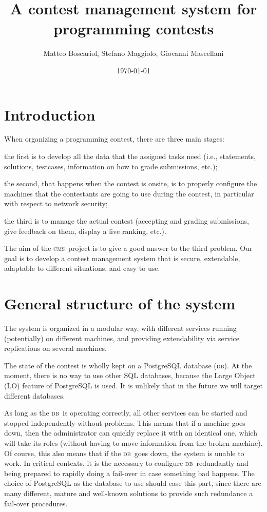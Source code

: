 \documentclass[a4paper,8pt]{amsart}
\title{A contest management system for programming contests}
\author{Matteo Boscariol, Stefano Maggiolo, Giovanni Mascellani}
\date{\today}
\newcommand{\CMS}{\textsc{cms}}
\newcommand{\DB}{\textsc{db}}
\newenvironment{squishlist}{%
  \begin{list}{\textbullet}%
    { \setlength{\itemsep}{0pt}%
      \setlength{\parsep}{3pt}%
      \setlength{\topsep}{3pt}%
      \setlength{\partopsep}{0pt}%
      \setlength{\leftmargin}{1.5em}%
      \setlength{\labelwidth}{1em}%
      \setlength{\labelsep}{0.5em} }%
}{\end{list}}
\begin{document}
\maketitle
\tableofcontents

\begin{multicols}{2}

  \section{Introduction}

  When organizing a programming contest, there are three main stages:
  \begin{squishlist}
  \item the first is to develop all the data that the assigned tasks
    need (i.e., statements, solutions, testcases, information on how
    to grade submissions, etc.);
  \item the second, that happens when the contest is onsite, is to
    properly configure the machines that the contestants are going to
    use during the contest, in particular with respect to network
    security;
  \item the third is to manage the actual contest (accepting and
    grading submissions, give feedback on them, display a live
    ranking, etc.).
  \end{squishlist}

  The aim of the \CMS\ project is to give a good answer to the third
  problem. Our goal is to develop a contest management system that is
  secure, extendable, adaptable to different situations, and easy to
  use.

  \section{General structure of the system}

  The system is organized in a modular way, with different services
  running (potentially) on different machines, and providing
  extendability via service replications on several machines.

  The state of the contest is wholly kept on a PostgreSQL database
  (\DB). At the moment, there is no way to use other SQL databases,
  because the Large Object (LO) feature of PostgreSQL is used. It is
  unlikely that in the future we will target different databases.

  As long as the \DB\ is operating correctly, all other services can
  be started and stopped independently without problems. This means
  that if a machine goes down, then the administrator can quickly
  replace it with an identical one, which will take its roles (without
  having to move information from the broken machine). Of course, this
  also means that if the \DB\ goes down, the system is unable to
  work. In critical contexts, it is the necessary to configure \DB\
  redundantly and being prepared to rapidly doing a fail-over in case
  something bad happens. The choice of PostgreSQL as the database to
  use should ease this part, since there are many different, mature
  and well-known solutions to provide such redundance a fail-over
  procedures.


\end{multicols}
\end{document}
